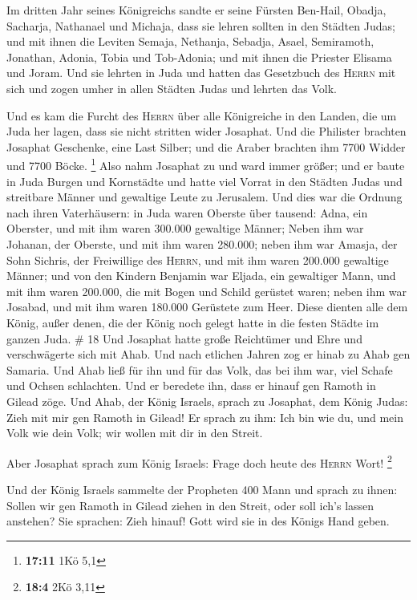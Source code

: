  Im dritten Jahr seines Königreichs sandte er seine
Fürsten Ben-Hail, Obadja, Sacharja, Nathanael und Michaja, dass sie
lehren sollten in den Städten Judas;  und mit ihnen die
Leviten Semaja, Nethanja, Sebadja, Asael, Semiramoth, Jonathan, Adonia,
Tobia und Tob-Adonia; und mit ihnen die Priester Elisama und Joram.
 Und sie lehrten in Juda und hatten das Gesetzbuch des
\textsc{Herrn} mit sich und zogen umher in allen Städten Judas und
lehrten das Volk.

 Und es kam die Furcht des \textsc{Herrn} über alle
Königreiche in den Landen, die um Juda her lagen, dass sie nicht
stritten wider Josaphat.  Und die Philister brachten
Josaphat Geschenke, eine Last Silber; und die Araber brachten ihm 7700
Widder und 7700 Böcke. \footnote{\textbf{17:11} 1Kö 5,1} 
Also nahm Josaphat zu und ward immer größer; und er baute in Juda Burgen
und Kornstädte  und hatte viel Vorrat in den Städten
Judas und streitbare Männer und gewaltige Leute zu Jerusalem.
 Und dies war die Ordnung nach ihren Vaterhäusern: in
Juda waren Oberste über tausend: Adna, ein Oberster, und mit ihm waren
300.000 gewaltige Männer;  Neben ihm war Johanan, der
Oberste, und mit ihm waren 280.000;  neben ihm war
Amasja, der Sohn Sichris, der Freiwillige des \textsc{Herrn}, und mit
ihm waren 200.000 gewaltige Männer;  und von den Kindern
Benjamin war Eljada, ein gewaltiger Mann, und mit ihm waren 200.000, die
mit Bogen und Schild gerüstet waren;  neben ihm war
Josabad, und mit ihm waren 180.000 Gerüstete zum Heer. 
Diese dienten alle dem König, außer denen, die der König noch gelegt
hatte in die festen Städte im ganzen Juda. \# 18  Und
Josaphat hatte große Reichtümer und Ehre und verschwägerte sich mit
Ahab.  Und nach etlichen Jahren zog er hinab zu Ahab gen
Samaria. Und Ahab ließ für ihn und für das Volk, das bei ihm war, viel
Schafe und Ochsen schlachten. Und er beredete ihn, dass er hinauf gen
Ramoth in Gilead zöge.  Und Ahab, der König Israels,
sprach zu Josaphat, dem König Judas: Zieh mit mir gen Ramoth in Gilead!
Er sprach zu ihm: Ich bin wie du, und mein Volk wie dein Volk; wir
wollen mit dir in den Streit.

 Aber Josaphat sprach zum König Israels: Frage doch heute
des \textsc{Herrn} Wort! \footnote{\textbf{18:4} 2Kö 3,11}

 Und der König Israels sammelte der Propheten 400 Mann und
sprach zu ihnen: Sollen wir gen Ramoth in Gilead ziehen in den Streit,
oder soll ich's lassen anstehen? Sie sprachen: Zieh hinauf! Gott wird
sie in des Königs Hand geben.

